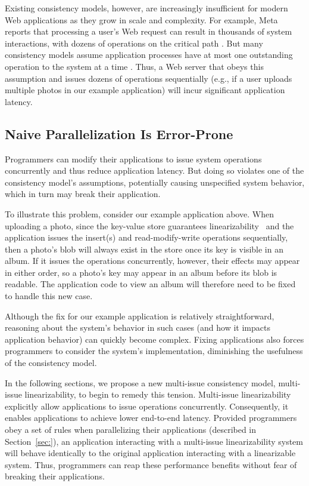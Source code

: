 Existing consistency models, however, are increasingly insufficient for modern Web applications as they grow in scale and complexity. For example, Meta reports that processing a user's Web request can result in thousands of system interactions, with dozens of operations on the critical path \cite{ajoux2015challenges}. But many consistency models assume application processes have at most one outstanding operation to the system at a time \cite{ahamad1995causal,herlihy1990linearizability}. Thus, a Web server that obeys this assumption and issues dozens of operations sequentially
(e.g., if a user uploads multiple photos in our example application)
will incur significant application latency.

\subsection{Naive Parallelization Is Error-Prone}

Programmers can modify their applications to issue system operations concurrently
and thus reduce application latency. But doing so violates one of the consistency
model’s assumptions, potentially causing unspecified system behavior,
which in turn may break their application.

To illustrate this problem, consider our example application above.
When uploading a photo, since the key-value store guarantees
linearizability~\cite{herlihy1990linearizability} and the application issues the
insert(s) and read-modify-write operations sequentially, then a photo’s blob will
always exist in the store once its key is visible in an album.
If it issues the operations concurrently, however, their effects may appear in either order,
so a photo’s key may appear in an album before its blob is readable.
The application code to view an album will therefore need to be fixed to handle this new case.

Although the fix for our example application is relatively straightforward,
reasoning about the system’s behavior in such cases (and how it impacts application behavior)
can quickly become complex.
Fixing applications also forces programmers to consider the system’s implementation,
diminishing the usefulness of the consistency model.

In the following sections, we propose a new multi-issue consistency model, multi-issue linearizability, to begin to remedy this tension. Multi-issue linearizability explicitly allow applications to issue operations concurrently. Consequently, it enables applications to achieve lower end-to-end latency. Provided programmers obey a set of rules when parallelizing their applications (described in Section~\ref{sec:}), an application interacting with a multi-issue linearizability system will behave identically to the original application interacting with a linearizable system. Thus, programmers can reap these performance benefits without fear of breaking their applications.